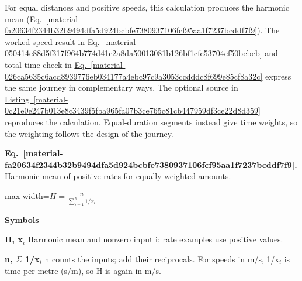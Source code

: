 \documentclass[11pt,a4paper]{article}
\begin{document}
For equal distances and positive speeds, this calculation produces the harmonic mean (\hyperref[material-fa20634f2344b32b9494dfa5d924bcbfe7380937106fcf95aa1f7237bcddf7f9]{Eq.~\ref*{material-fa20634f2344b32b9494dfa5d924bcbfe7380937106fcf95aa1f7237bcddf7f9}}). The worked speed result in \hyperref[material-050414e88d5f317f964b774d41c2a8da50013081b126bf1cfc53704cf50bebeb]{Eq.~\ref*{material-050414e88d5f317f964b774d41c2a8da50013081b126bf1cfc53704cf50bebeb}} and total-time check in \hyperref[material-026ca5635c6acd8939776eb034177a4ebc97c9a3053ccdddc8f699e85cf8a32c]{Eq.~\ref*{material-026ca5635c6acd8939776eb034177a4ebc97c9a3053ccdddc8f699e85cf8a32c}} express the same journey in complementary ways. The optional source in \hyperref[material-0c21e0e247b013e8c3439f5fba965fa07b3ce765c81cb447959df3ce22d8d359]{Listing~\ref*{material-0c21e0e247b013e8c3439f5fba965fa07b3ce765c81cb447959df3ce22d8d359}} reproduces the calculation. Equal-duration segments instead give time weights, so the weighting follows the design of the journey.


\par\medskip
\begin{samepage}
\label{material-fa20634f2344b32b9494dfa5d924bcbfe7380937106fcf95aa1f7237bcddf7f9}
\noindent\textbf{Eq.~\ref*{material-fa20634f2344b32b9494dfa5d924bcbfe7380937106fcf95aa1f7237bcddf7f9}.} Harmonic mean of positive rates for equally weighted amounts.\par\nopagebreak
\begin{center}\begin{adjustbox}{max width=\linewidth}$\displaystyle H = \frac{n}{\sum_{i=1}^{n} 1/x_i}$\end{adjustbox}\end{center}

\par\noindent\textbf{Symbols}

\par\noindent\textbf{H, x\ensuremath{{}_i}} Harmonic mean and nonzero input i; rate examples use positive values.

\par\noindent\textbf{n, \ensuremath{\Sigma} 1/x\ensuremath{{}_i}} n counts the inputs; add their reciprocals. For speeds in m/s, 1/x\ensuremath{{}_i} is time per metre (s/m), so H is again in m/s.

\end{samepage}
\medskip
\end{document}
